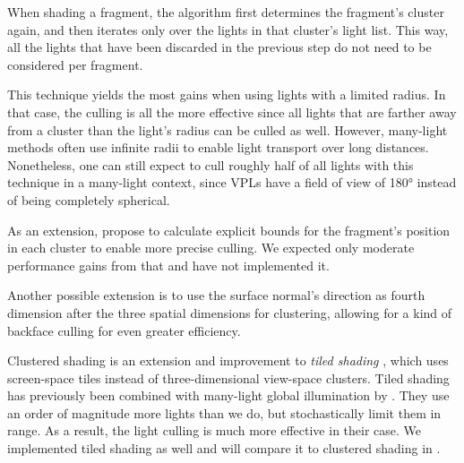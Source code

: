 When shading a fragment, the algorithm first determines the fragment's cluster again, and then iterates only over the lights in that cluster's light list. This way, all the lights that have been discarded in the previous step do not need to be considered per fragment.

This technique yields the most gains when using lights with a limited radius. In that case, the culling is all the more effective since all lights that are farther away from a cluster than the light's radius can be culled as well. However, many-light methods often use infinite radii to enable light transport over long distances. Nonetheless, one can still expect to cull roughly half of all lights with this technique in a many-light context, since VPLs have a field of view of 180° instead of being completely spherical.

As an extension, \citet{olsson2012clustered} propose to calculate explicit bounds for the fragment's position in each cluster to enable more precise culling. We expected only moderate performance gains from that and have not implemented it.

Another possible extension is to use the surface normal's direction as fourth dimension after the three spatial dimensions for clustering, allowing for a kind of backface culling for even greater efficiency.


Clustered shading is an extension and improvement to \textit{tiled shading} \citep{Olsson:2011:TiledShading}, which uses screen-space tiles instead of three-dimensional view-space clusters. Tiled shading has previously been combined with many-light global illumination by \citet{Tokuyoshi:2016:Stochastic}. They use an order of magnitude more lights than we do, but stochastically limit them in range. As a result, the light culling is much more effective in their case.
We implemented tiled shading as well and will compare it to clustered shading in .
